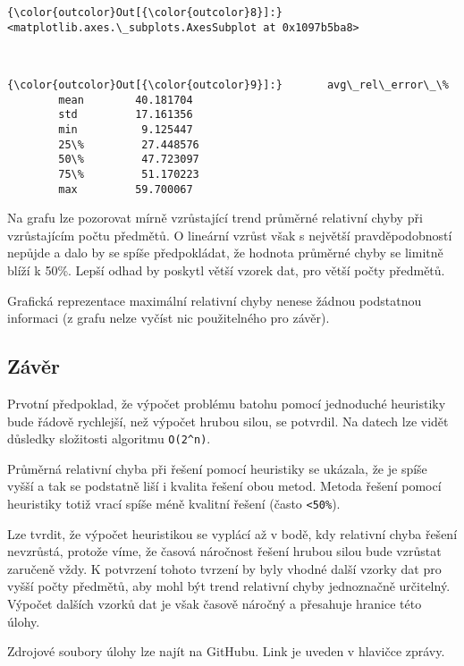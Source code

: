 \documentclass[11pt]{article}
\begin{document}
\begin{Verbatim}[commandchars=\\\{\}]
{\color{outcolor}Out[{\color{outcolor}8}]:} <matplotlib.axes.\_subplots.AxesSubplot at 0x1097b5ba8>
\end{Verbatim}
            
    \begin{center}
    \end{center}
    { \hspace*{\fill} \\}
    
\begin{Verbatim}[commandchars=\\\{\}]
{\color{outcolor}Out[{\color{outcolor}9}]:}       avg\_rel\_error\_\%
        mean        40.181704
        std         17.161356
        min          9.125447
        25\%         27.448576
        50\%         47.723097
        75\%         51.170223
        max         59.700067
\end{Verbatim}
            
    Na grafu lze pozorovat mírně vzrůstající trend průměrné relativní chyby
při vzrůstajícím počtu předmětů. O lineární vzrůst však s největší
pravděpodobností nepůjde a dalo by se spíše předpokládat, že hodnota
průměrné chyby se limitně blíží k 50\%. Lepší odhad by poskytl větší
vzorek dat, pro větší počty předmětů.

Grafická reprezentace maximální relativní chyby nenese žádnou podstatnou
informaci (z grafu nelze vyčíst nic použitelného pro závěr).

    \subsection{Závěr}\label{zuxe1vux11br}

Prvotní předpoklad, že výpočet problému batohu pomocí jednoduché
heuristiky bude řádově rychlejší, než výpočet hrubou silou, se potvrdil.
Na datech lze vidět důsledky složitosti algoritmu \texttt{O(2\^{}n)}.

Průměrná relativní chyba při řešení pomocí heuristiky se ukázala, že je
spíše vyšší a tak se podstatně liší i kvalita řešení obou metod. Metoda
řešení pomocí heuristiky totiž vrací spíše méně kvalitní řešení (často
\texttt{\textless{}50\%}).

Lze tvrdit, že výpočet heuristikou se vyplácí až v bodě, kdy relativní
chyba řešení nevzrůstá, protože víme, že časová náročnost řešení hrubou
silou bude vzrůstat zaručeně vždy. K potvrzení tohoto tvrzení by byly
vhodné další vzorky dat pro vyšší počty předmětů, aby mohl být trend
relativní chyby jednoznačně určitelný. Výpočet dalších vzorků dat je
však časově náročný a přesahuje hranice této úlohy.

Zdrojové soubory úlohy lze najít na GitHubu. Link je uveden v hlavičce
zprávy.


    
    
    
    
\end{document}
